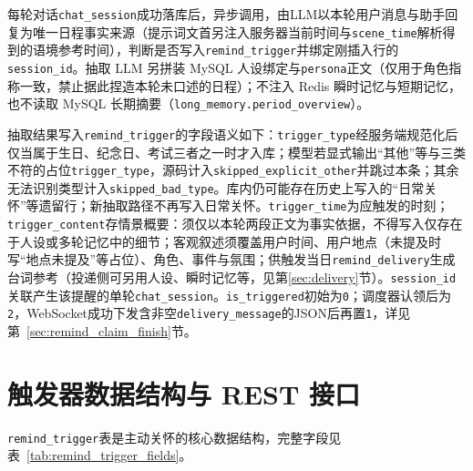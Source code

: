 \documentclass{base}
\begin{document}
每轮对话\texttt{chat\_session}成功落库后，异步调用，由LLM以本轮用户消息与助手回复为唯一日程事实来源（提示词文首另注入服务器当前时间与\texttt{scene\_time}解析得到的语境参考时间），判断是否写入\texttt{remind\_trigger}并绑定刚插入行的 \texttt{session\_id}。抽取 LLM 另拼装 MySQL 人设绑定与\texttt{persona}正文（仅用于角色指称一致，禁止据此捏造本轮未口述的日程）；不注入 Redis 瞬时记忆与短期记忆，也不读取 MySQL 长期摘要（\texttt{long\_memory.period\_overview}）。

抽取结果写入\texttt{remind\_trigger}的字段语义如下：\texttt{trigger\_type}经服务端规范化后仅当属于生日、纪念日、考试三者之一时才入库；模型若显式输出``其他''等与三类不符的占位\texttt{trigger\_type}，源码计入\texttt{skipped\_explicit\_other}并跳过本条；其余无法识别类型计入\texttt{skipped\_bad\_type}。库内仍可能存在历史上写入的``日常关怀''等遗留行；新抽取路径不再写入日常关怀。\texttt{trigger\_time}为应触发的时刻；\texttt{trigger\_content}存情景概要：须仅以本轮两段正文为事实依据，不得写入仅存在于人设或多轮记忆中的细节；客观叙述须覆盖用户时间、用户地点（未提及时写``地点未提及''等占位）、角色、事件与氛围；供触发当日\texttt{remind\_delivery}生成台词参考（投递侧可另用人设、瞬时记忆等，见第\ref{sec:delivery}节）。\texttt{session\_id}关联产生该提醒的单轮\texttt{chat\_session}。\texttt{is\_triggered}初始为\texttt{0}；调度器认领后为\texttt{2}，WebSocket成功下发含非空\texttt{delivery\_message}的JSON后再置\texttt{1}，详见第~\ref{sec:remind_claim_finish}节。

\section{触发器数据结构与 REST 接口}

\texttt{remind\_trigger}表是主动关怀的核心数据结构，完整字段见表~\ref{tab:remind_trigger_fields}。
\end{document}
